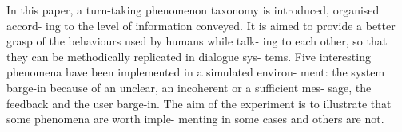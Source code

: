 In this paper, a turn-taking phenomenon taxonomy is introduced, organised accord- ing to the level of information conveyed. It is aimed to provide a better grasp of the behaviours used by humans while talk- ing to each other, so that they can be methodically replicated in dialogue sys- tems. Five interesting phenomena have been implemented in a simulated environ- ment: the system barge-in because of an unclear, an incoherent or a sufficient mes- sage, the feedback and the user barge-in. The aim of the experiment is to illustrate that some phenomena are worth imple- menting in some cases and others are not.
